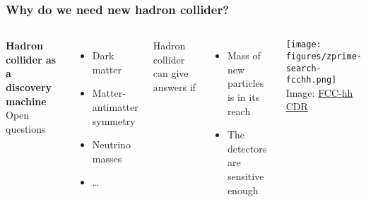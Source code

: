\documentclass[aspectratio=169]{beamer}
\newcommand{\bluetext}[1]{%
  \textcolor{myBlue}{#1}
}
\begin{document}
\begin{frame}
  \frametitle{Why do we need new hadron collider?}

  \begin{columns}[c]

    \bluetext{{\bf Hadron collider as a discovery machine}}\\

    \bluetext{Open questions}
    \begin{itemize}
      \item Dark matter
      \item Matter-antimatter symmetry
      \item Neutrino masses
      \item \dots
    \end{itemize}
    \pause%

    \bluetext{Hadron collider can give answers if}
    \begin{itemize}
      \item Mass of new particles is in its reach
      \item The detectors are sensitive enough
    \end{itemize}


    \texttt{[image: figures/zprime-search-fcchh.png]} \\
    \tiny{Image: \href{https://cds.cern.ch/record/2651300?ln=en}{FCC-hh CDR}}
  \end{columns}
\end{frame}
\end{document}
